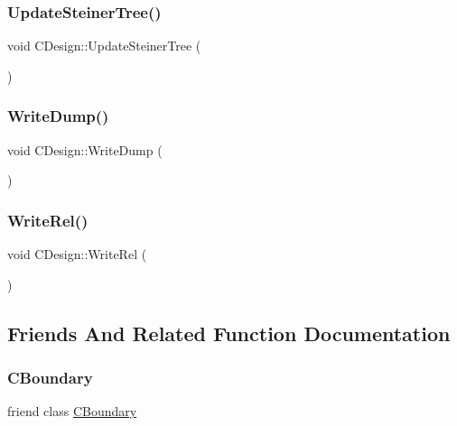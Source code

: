 \mbox{\label{classCDesign_a9571bf3353ab819782f0162867e525dc}} 
\subsubsection{\texorpdfstring{UpdateSteinerTree()}{UpdateSteinerTree()}}
{\footnotesize\ttfamily void C\+Design\+::\+Update\+Steiner\+Tree (\begin{DoxyParamCaption}{ }\end{DoxyParamCaption})}

\mbox{\label{classCDesign_a984162e6e0b47da02f4a34e176f0a569}} 
\subsubsection{\texorpdfstring{WriteDump()}{WriteDump()}}
{\footnotesize\ttfamily void C\+Design\+::\+Write\+Dump (\begin{DoxyParamCaption}{ }\end{DoxyParamCaption})}

\mbox{\label{classCDesign_a69b246b26e9ce4c4edbf74065529b89f}} 
\subsubsection{\texorpdfstring{WriteRel()}{WriteRel()}}
{\footnotesize\ttfamily void C\+Design\+::\+Write\+Rel (\begin{DoxyParamCaption}{ }\end{DoxyParamCaption})}



\subsection{Friends And Related Function Documentation}
\mbox{\label{classCDesign_aab1ae13155639bc23234a972a3296244}} 
\subsubsection{\texorpdfstring{CBoundary}{CBoundary}}
{\footnotesize\ttfamily friend class \mbox{\hyperlink{classCBoundary}{C\+Boundary}}\hspace{0.3cm}{\ttfamily [friend]}}

